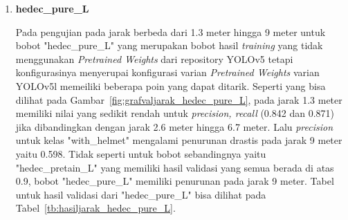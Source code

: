 \begin{enumerate}
   \newpage
  \item \textbf{hedec\_pure\_L}
  
  \par Pada pengujian pada jarak berbeda dari 1.3 meter hingga 9 meter untuk bobot "hedec\_pure\_L" yang merupakan bobot hasil \emph{training}
  yang tidak menggunakan \emph{Pretrained Weights} dari repository YOLOv5 tetapi konfigurasinya menyerupai konfigurasi
  varian \emph{Pretrained Weights} varian YOLOv5l memeiliki beberapa poin yang dapat ditarik. 
  Seperti yang bisa dilihat pada Gambar~\ref{fig:grafvaljarak_hedec_pure_L},
  pada jarak 1.3 meter memiliki nilai yang sedikit rendah untuk \emph{precision, recall} (0.842 dan 0.871) jika dibandingkan dengan jarak 2.6 meter hingga 6.7 meter. 
  Lalu \emph{precision} untuk kelas "with\_helmet" mengalami penurunan drastis pada jarak 9 meter yaitu 0.598.
  Tidak seperti untuk bobot sebandingnya yaitu "hedec\_pretain\_L" yang memiliki hasil validasi yang semua berada di atas 0.9, bobot "hedec\_pure\_L" memiliki penurunan
  pada jarak 9 meter.
  Tabel untuk hasil validasi dari "hedec\_pure\_L" bisa dilihat
  pada Tabel~\ref{tb:hasiljarak_hedec_pure_L}.
  

\end{enumerate}
